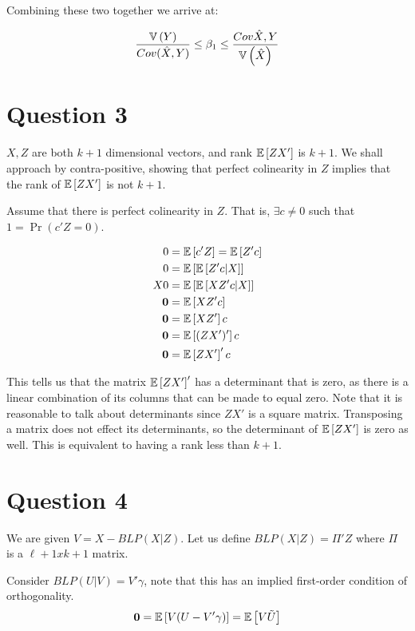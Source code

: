 \documentclass[12pt]{paper}
\begin{document}
Combining these two together we arrive at:

\begin{equation*}
  \frac{\mathbb{V} \left ( Y \right )}{Cov( \hat{X}, Y)} \leq \beta_1 \leq \frac{Cov{\hat{X},Y}}{\mathbb{V} \left ( \hat{X} \right )}
\end{equation*}

\section*{Question 3}

$X,Z$ are both $k+1$ dimensional vectors, and rank $\mathbb{E} \left [ ZX' \right ]$ is
$k+1$.  We shall approach by contra-positive, showing that perfect
colinearity in $Z$ implies that the rank of $\mathbb{E} \left [ ZX' \right ]$ is not $k+1$.

Assume that there is perfect colinearity in $Z$. That is, $\exists c \neq 0$
such that $1 = \Pr ( c' Z = 0)$.

\begin{align*}
  0 &= \mathbb{E} \left [ c'Z \right ] = \mathbb{E} \left [ Z' c \right ]\\
  0 &= \mathbb{E} \left [  \mathbb{E} \left [  Z' c \vert X \right ] \right ]\\
  X 0 &= \mathbb{E} \left [  \mathbb{E} \left [  X Z' c \vert X \right ] \right ]\\
  \bm{ 0 } &= \mathbb{E} \left [  X Z' c \right ]\\
  \bm{ 0 } &= \mathbb{E} \left [  X Z'  \right ] c\\
  \bm{ 0 } &= \mathbb{E} \left [  (Z X')'  \right ] c\\
  \bm{ 0 } &= \mathbb{E} \left [  Z X'  \right ]' c
\end{align*}

This tells us that the matrix $\mathbb{E} \left [ Z X' \right ]'$ has a determinant that is
zero, as there is a linear combination of its columns that can be
made to equal zero. Note that it is reasonable to talk about
determinants since $ZX'$ is a square matrix. Transposing a matrix does
not effect its determinants, so the determinant of $\mathbb{E} \left [ Z X' \right ]$ is
zero as well. This is equivalent to having a rank less than $k+1$.


\section*{Question 4}

We are given $V = X - BLP(X \vert Z)$. Let us define
$BLP(X \vert Z) = \Pi' Z$ where $\Pi$ is a $\ell+1 x k +1$ matrix.

Consider $BLP( U \vert V) = V' \gamma$, note that this has an implied
first-order condition of orthogonality.
\begin{equation*}
  \bm{ 0 } = \mathbb{E} \left [  V ( U - V' \gamma) \right ] = \mathbb{E} \left [  V \tilde{U} \right ]
\end{equation*}
\end{document}
